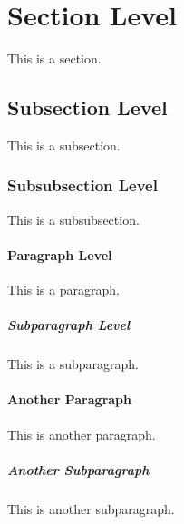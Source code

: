 \documentclass{article}
\begin{document}
\tableofcontents

\section{Section Level}
This is a section.

\subsection{Subsection Level}
This is a subsection.

\subsubsection{Subsubsection Level}
This is a subsubsection.

\paragraph{Paragraph Level}
This is a paragraph.

\subparagraph{Subparagraph Level}
This is a subparagraph.

\paragraph{Another Paragraph}
This is another paragraph.

\subparagraph{Another Subparagraph}
This is another subparagraph.
\end{document}
